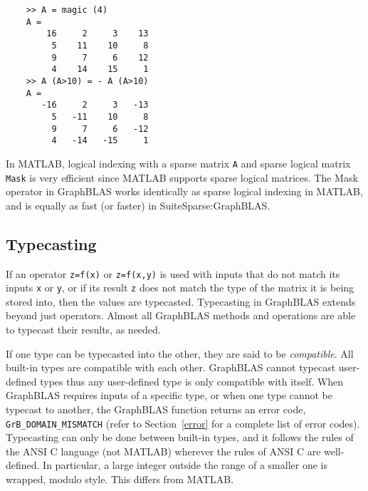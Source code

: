 \documentclass[12pt]{article}
\begin{document}
    \begin{mdframed}
    {\footnotesize
    \begin{verbatim}
    >> A = magic (4)
    A =
        16     2     3    13
         5    11    10     8
         9     7     6    12
         4    14    15     1
    >> A (A>10) = - A (A>10)
    A =
       -16     2     3   -13
         5   -11    10     8
         9     7     6   -12
         4   -14   -15     1 \end{verbatim} } \end{mdframed}

In MATLAB, logical indexing with a sparse matrix \verb'A' and sparse logical
matrix \verb'Mask' is very efficient since MATLAB supports sparse logical
matrices.  The Mask operator in GraphBLAS works identically as sparse logical
indexing in MATLAB, and is equally as fast (or faster) in SuiteSparse:GraphBLAS.

\subsection{Typecasting} %
\label{typecasting}

If an operator \verb'z=f(x)' or \verb'z=f(x,y)' is used with inputs that do not
match its inputs \verb'x' or \verb'y', or if its result \verb'z' does not match
the type of the matrix it is being stored into, then the values are typecasted.
Typecasting in GraphBLAS extends beyond just operators.  Almost all GraphBLAS
methods and operations are able to typecast their results, as needed.

If one type can be typecasted into the other, they are said to be {\em
compatible}.  All built-in types are compatible with each other.  GraphBLAS
cannot typecast user-defined types thus any user-defined type is only
compatible with itself.  When GraphBLAS requires inputs of a specific type, or
when one type cannot be typecast to another, the GraphBLAS function returns an
error code, \verb'GrB_DOMAIN_MISMATCH' (refer to Section~\ref{error} for a
complete list of error codes).  Typecasting can only be done between built-in
types, and it follows the rules of the ANSI C language (not MATLAB) wherever
the rules of ANSI C are well-defined.   In particular, a large integer outside
the range of a smaller one is wrapped, modulo style.  This differs from MATLAB.
\end{document}
